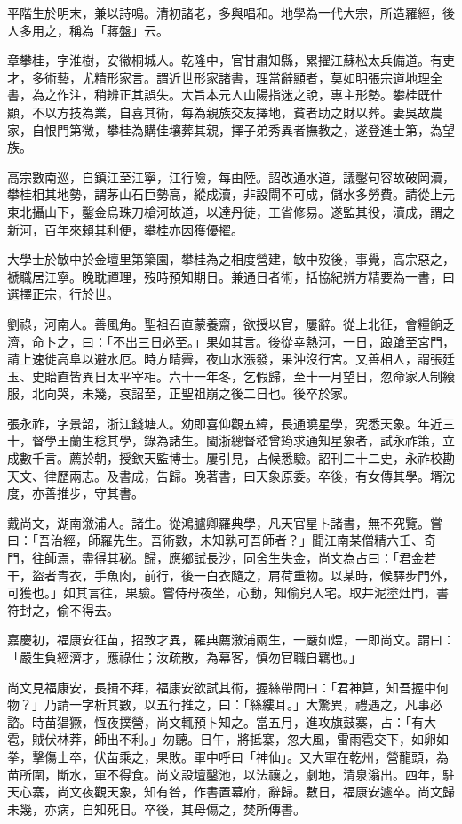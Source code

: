 \begin{pinyinscope}
平階生於明末，兼以詩鳴。清初諸老，多與唱和。地學為一代大宗，所造羅經，後人多用之，稱為「蔣盤」云。

章攀桂，字淮樹，安徽桐城人。乾隆中，官甘肅知縣，累擢江蘇松太兵備道。有吏才，多術藝，尤精形家言。謂近世形家諸書，理當辭顯者，莫如明張宗道地理全書，為之作注，稍辨正其誤失。大旨本元人山陽指迷之說，專主形勢。攀桂既仕顯，不以方技為業，自喜其術，每為親族交友擇地，貧者助之財以葬。妻吳故農家，自恨門第微，攀桂為購佳壤葬其親，擇子弟秀異者撫教之，遂登進士第，為望族。

高宗數南巡，自鎮江至江寧，江行險，每由陸。詔改通水道，議鑿句容故破岡瀆，攀桂相其地勢，謂茅山石巨勢高，縱成瀆，非設閘不可成，儲水多勞費。請從上元東北攝山下，鑿金烏珠刀槍河故道，以達丹徒，工省修易。遂監其役，瀆成，謂之新河，百年來賴其利便，攀桂亦因獲優擢。

大學士於敏中於金壇里第築園，攀桂為之相度營建，敏中歿後，事覺，高宗惡之，褫職居江寧。晚耽禪理，歿時預知期日。兼通日者術，括協紀辨方精要為一書，曰選擇正宗，行於世。

劉祿，河南人。善風角。聖祖召直蒙養齋，欲授以官，屢辭。從上北征，會糧餉乏濟，命卜之，曰：「不出三日必至。」果如其言。後從幸熱河，一日，踉蹌至宮門，請上速徙高阜以避水厄。時方晴霽，夜山水漲發，果沖沒行宮。又善相人，謂張廷玉、史貽直皆異日太平宰相。六十一年冬，乞假歸，至十一月望日，忽命家人制縗服，北向哭，未幾，哀詔至，正聖祖崩之後二日也。後卒於家。

張永祚，字景韶，浙江錢塘人。幼即喜仰觀五緯，長通曉星學，究悉天象。年近三十，督學王蘭生稔其學，錄為諸生。閩浙總督嵇曾筠求通知星象者，試永祚策，立成數千言。薦於朝，授欽天監博士。屢引見，占候悉驗。詔刊二十二史，永祚校勘天文、律歷兩志。及書成，告歸。晚著書，曰天象原委。卒後，有女傳其學。壻沈度，亦善推步，守其書。

戴尚文，湖南漵浦人。諸生。從鴻臚卿羅典學，凡天官星卜諸書，無不究覽。嘗曰：「吾治經，師羅先生。吾術數，未知孰可吾師者？」聞江南某僧精六壬、奇門，往師焉，盡得其秘。歸，應鄉試長沙，同舍生失金，尚文為占曰：「君金若干，盜者青衣，手魚肉，前行，後一白衣隨之，肩荷重物。以某時，候驛步門外，可獲也。」如其言往，果驗。嘗侍母夜坐，心動，知偷兒入宅。取井泥塗灶門，書符封之，偷不得去。

嘉慶初，福康安征苗，招致才異，羅典薦漵浦兩生，一嚴如煜，一即尚文。謂曰：「嚴生負經濟才，應祿仕；汝疏散，為幕客，慎勿官職自羈也。」

尚文見福康安，長揖不拜，福康安欲試其術，握絲帶問曰：「君神算，知吾握中何物？」乃請一字析其數，以五行推之，曰：「絲縷耳。」大驚異，禮遇之，凡事必諮。時苗猖獗，恆夜撲營，尚文輒預卜知之。當五月，進攻旗鼓寨，占：「有大雹，賊伏林莽，師出不利。」勿聽。日午，將抵寨，忽大風，雷雨雹交下，如卵如拳，擊傷士卒，伏苗乘之，果敗。軍中呼曰「神仙」。又大軍在乾州，營龍頭，為苗所圍，斷水，軍不得食。尚文設壇鑿池，以法禳之，劇地，清泉滃出。四年，駐天心寨，尚文夜觀天象，知有咎，作書置幕府，辭歸。數日，福康安遽卒。尚文歸未幾，亦病，自知死日。卒後，其母傷之，焚所傳書。


\end{pinyinscope}